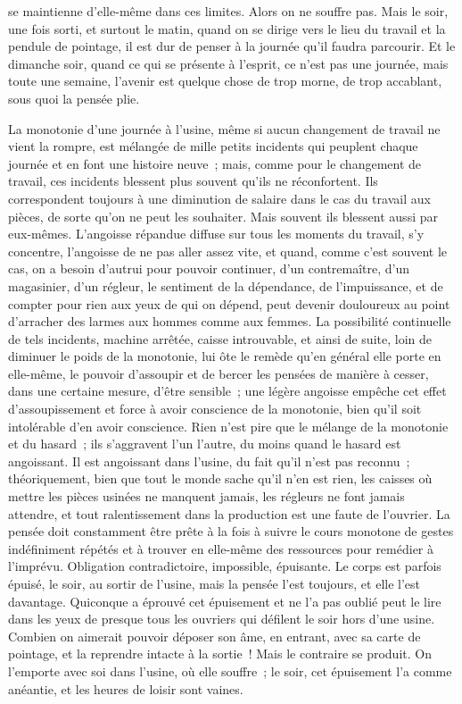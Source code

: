 \documentclass[french,twoside]{book} %
\begin{document}
se maintienne d'elle-même dans ces limites. Alors on ne souffre pas. Mais le soir, une fois sorti, et surtout le matin, quand on se dirige vers le lieu du travail et la pendule de pointage, il est dur de penser à la journée qu'il faudra parcourir. Et le dimanche soir, quand ce qui se présente à l'esprit, ce n'est pas une journée, mais toute une semaine, l'avenir est quelque chose de trop morne, de trop accablant, sous quoi la pensée plie.\par
La monotonie d'une journée à l'usine, même si aucun changement de travail ne vient la rompre, est mélangée de mille petits incidents qui peuplent chaque journée et en font une histoire neuve ; mais, comme pour le changement de travail, ces incidents blessent plus souvent qu'ils ne réconfortent. Ils correspondent toujours à une diminution de salaire dans le cas du travail aux pièces, de sorte qu'on ne peut les souhaiter. Mais souvent ils blessent aussi par eux-mêmes. L'angoisse répandue diffuse sur tous les moments du travail, s'y concentre, l'angoisse de ne pas aller assez vite, et quand, comme c'est souvent le cas, on a besoin d'autrui pour pouvoir continuer, d'un contremaître, d'un magasinier, d'un régleur, le sentiment de la dépendance, de l'impuissance, et de compter pour rien aux yeux de qui on dépend, peut devenir douloureux au point d'arracher des larmes aux hommes comme aux femmes. La possibilité continuelle de tels incidents, machine arrêtée, caisse introuvable, et ainsi de suite, loin de diminuer le poids de la monotonie, lui ôte le remède qu'en général elle porte en elle-même, le pouvoir d'assoupir et de bercer les pensées de manière à cesser, dans une certaine mesure, d'être sensible ; une légère angoisse empêche cet effet d'assoupissement et force à avoir conscience de la monotonie, bien qu'il soit intolérable d'en avoir conscience. Rien n'est pire que le mélange de la monotonie et du hasard ; ils s'aggravent l'un l'autre, du moins quand le hasard est angoissant. Il est angoissant dans l'usine, du fait qu'il n'est pas reconnu ; théoriquement, bien que tout le monde sache qu'il n'en est rien, les caisses où mettre les pièces usinées ne manquent jamais, les régleurs ne font jamais attendre, et tout ralentissement dans la production est une faute de l'ouvrier. La pensée doit constamment être prête à la fois à suivre le cours monotone de gestes indéfiniment répétés et à trouver en elle-même des ressources pour remédier à l'imprévu. Obligation contradictoire, impossible, épuisante. Le corps est parfois épuisé, le soir, au sortir de l'usine, mais la pensée l'est toujours, et elle l'est davantage. Quiconque a éprouvé cet épuisement et ne l'a pas oublié peut le lire dans les yeux de presque tous les ouvriers qui défilent le soir hors d'une usine. Combien on aimerait pouvoir déposer son âme, en entrant, avec sa carte de pointage, et la reprendre intacte à la sortie ! Mais le contraire se produit. On l'emporte avec soi dans l'usine, où elle souffre ; le soir, cet épuisement l'a comme anéantie, et les heures de loisir sont vaines.\par
\end{document}
